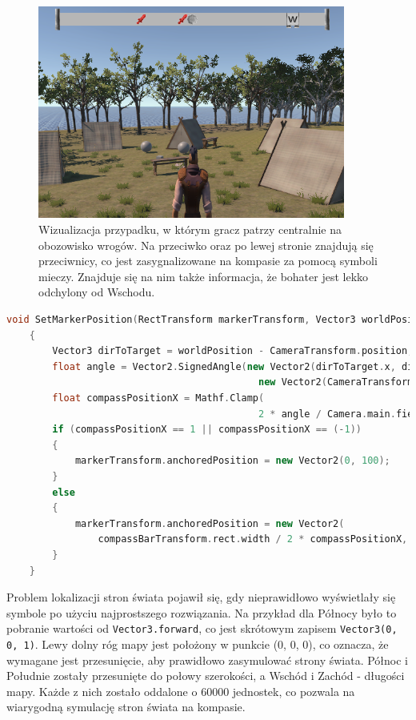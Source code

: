 \begin{figure}[htbp]
    \centering
    \includegraphics[width=0.9\textwidth]{images/ui/compass.png}
    \caption{Wizualizacja przypadku, w którym gracz patrzy centralnie na obozowisko wrogów. Na przeciwko oraz po lewej stronie znajdują się przeciwnicy, co jest zasygnalizowane na kompasie za pomocą symboli mieczy. Znajduje się na nim także informacja, że bohater jest lekko odchylony od Wschodu.
    }\label{fig:compass}
\end{figure}
\FloatBarrier
    \begin{lstlisting}[language=C++, caption=Fragment kodu odpowiedzialny za ustawienie symbolu na pasku kompasu.]
    void SetMarkerPosition(RectTransform markerTransform, Vector3 worldPosition)
    {
        Vector3 dirToTarget = worldPosition - CameraTransform.position;
        float angle = Vector2.SignedAngle(new Vector2(dirToTarget.x, dirToTarget.z), 
                                            new Vector2(CameraTransform.transform.forward.x, CameraTransform.transform.forward.z));
        float compassPositionX = Mathf.Clamp(
                                            2 * angle / Camera.main.fieldOfView, -1, 1);
        if (compassPositionX == 1 || compassPositionX == (-1))
        {
            markerTransform.anchoredPosition = new Vector2(0, 100);
        }
        else
        {
            markerTransform.anchoredPosition = new Vector2(
                compassBarTransform.rect.width / 2 * compassPositionX, 0);
        }
    }
    \end{lstlisting}
\FloatBarrier
Problem lokalizacji stron świata pojawił się, gdy nieprawidłowo wyświetlały się symbole po użyciu najprostszego rozwiązania. Na przykład dla Północy było to
pobranie wartości od \texttt{Vector3.forward}, co jest skrótowym zapisem \texttt{Vector3(0, 0, 1)}. Lewy dolny róg mapy jest położony w punkcie (0, 0, 0), co oznacza, że wymagane
 jest przesunięcie, aby prawidłowo zasymulować strony świata. Północ i Południe  zostały przesunięte do połowy szerokości, a Wschód i Zachód - długości mapy. Każde z nich
  zostało oddalone o 60000 jednostek, co pozwala na wiarygodną symulację stron świata na kompasie.

